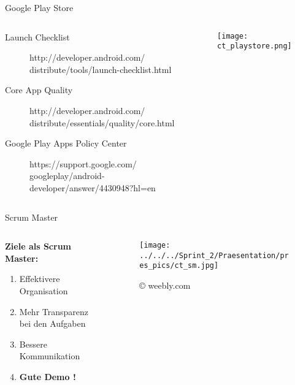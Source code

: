 \begin{frame}{Google Play Store}

  \begin{columns}[T] %
     \begin{column}[T]{0.55\textwidth} %


\begin{description}
\item[Launch Checklist] http://developer.android.com/ \\ distribute/tools/launch-checklist.html
\item[Core App Quality] http://developer.android.com/ \\ distribute/essentials/quality/core.html
\item[Google Play Apps Policy Center] https://support.google.com/ \\ googleplay/android-developer/answer/4430948?hl=en

\end{description}


     \end{column}
     \begin{column}[T]{0.45\textwidth} %
\begin{flushright}
\texttt{[image: ct\_playstore.png]}
\end{flushright}


     \end{column}
     \end{columns}

\end{frame}


\begin{frame}{Scrum Master}

     \begin{columns}[T] %
     \begin{column}[T]{0.65\textwidth} %

     	\Large \textbf{Ziele als Scrum Master:}\\
		\begin{enumerate}
		\large
		\vfill\item Effektivere Organisation
		\vfill\item Mehr Transparenz bei den Aufgaben
		\vfill\item Bessere Kommunikation
		\vfill\item \textbf{Gute Demo !}
		\end{enumerate}
     \end{column}
     \begin{column}[T]{0.35\textwidth} %
		\begin{figure}
		\center
		\texttt{[image: ../../../Sprint\_2/Praesentation/pres\_pics/ct\_sm.jpg]}
		\caption*{© weebly.com}
		\end{figure}


     \end{column}
     \end{columns}

\end{frame}
